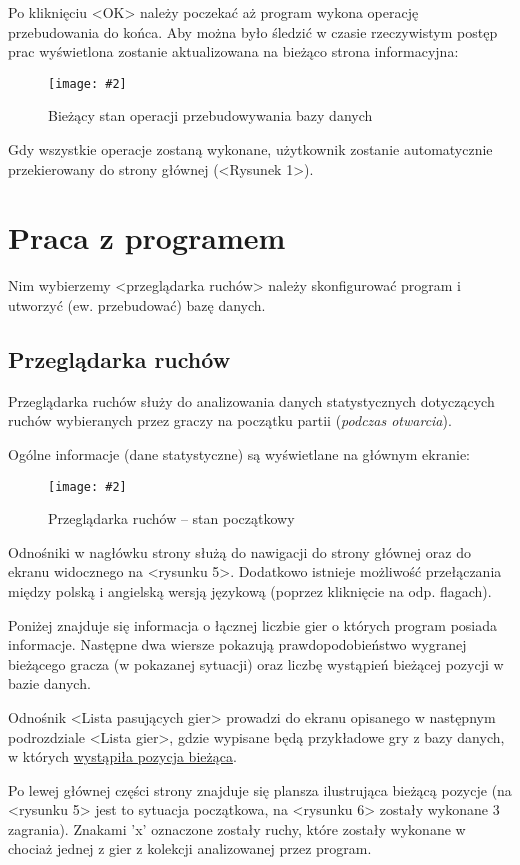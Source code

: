 \documentclass[10pt,leqno]{article}
\newcommand{\myimage}[3]{
  \begin{figure}[h!]
    \centering
      \texttt{[image: \#2]}
  \caption{#3}
  \end{figure}
}
\begin{document}
Po kliknięciu <OK> należy poczekać aż program wykona operację przebudowania do końca. 
Aby można było śledzić w czasie rzeczywistym postęp prac wyświetlona zostanie aktualizowana na bieżąco strona informacyjna:

\myimage{0.4}{status.png}{Bieżący stan operacji przebudowywania bazy danych}

Gdy wszystkie operacje zostaną wykonane, użytkownik zostanie automatycznie przekierowany do strony głównej (<Rysunek 1>).

\newpage

\section{Praca z programem}
Nim wybierzemy <przeglądarka ruchów> należy skonfigurować program i utworzyć (ew. przebudować) bazę danych.

\subsection{Przeglądarka ruchów}

Przeglądarka ruchów służy do analizowania danych statystycznych dotyczących ruchów 
wybieranych przez graczy na początku partii (\emph{podczas otwarcia}).

Ogólne informacje (dane statystyczne) są wyświetlane na głównym ekranie:

\myimage{0.47}{moveBrowserMain.png}{Przeglądarka ruchów -- stan początkowy}

Odnośniki w nagłówku strony służą do nawigacji do strony głównej oraz do ekranu widocznego na <rysunku 5>. 
Dodatkowo istnieje możliwość przełączania między polską i angielską wersją językową (poprzez kliknięcie na odp. flagach).

Poniżej znajduje się informacja o łącznej liczbie gier o których program posiada informacje. Następne dwa wiersze pokazują
prawdopodobieństwo wygranej bieżącego gracza (w pokazanej sytuacji) oraz liczbę wystąpień bieżącej pozycji w bazie danych.

Odnośnik <Lista pasujących gier> prowadzi do ekranu opisanego w następnym podrozdziale <Lista gier>, gdzie wypisane będą
przykładowe gry z bazy danych, w których \underline{wystąpiła pozycja bieżąca}.

Po lewej głównej części strony znajduje się plansza ilustrująca bieżącą pozycje (na <rysunku 5> jest to sytuacja początkowa, 
na <rysunku 6> zostały wykonane 3 zagrania). Znakami 'x' oznaczone zostały ruchy, które zostały wykonane w chociaż jednej z
gier z kolekcji analizowanej przez program. 
\end{document}
